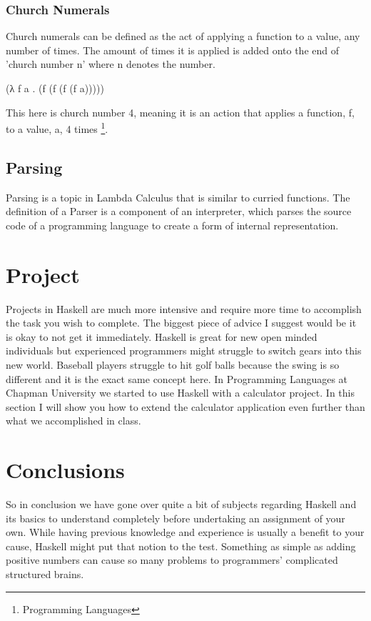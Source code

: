 \documentclass{article}
\begin{document}
        \subsubsection{Church Numerals}
        Church numerals can be defined as the act of applying a function to a value, any number of times. The amount of times it is applied is added onto the end of 'church number n' where n denotes the number.
        
        \medskip
             (\lambda λ f a . (f (f (f (f a)))))
        \medskip
    
    This here is church number 4, meaning it is an action that applies a function, f, to a value, a, 4 times \footnote{Programming Languages}.
        
    \subsection{Parsing}
    Parsing is a topic in Lambda Calculus that is similar to curried functions. The definition of a Parser is a component of an interpreter, which parses the source code of a programming language to create a form of internal representation.
    
    

\section{Project}

Projects in Haskell are much more intensive and require more time to accomplish the task you wish to complete. The biggest piece of advice I suggest would be it is okay to not get it immediately. Haskell is great for new open minded individuals but experienced programmers might struggle to switch gears into this new world. Baseball players struggle to hit golf balls because the swing is so different and it is the exact same concept here. In Programming Languages at Chapman University we started to use Haskell with a calculator project. In this section I will show you how to extend the calculator application even further than what we accomplished in class.

\section{Conclusions}\label{conclusions}

So in conclusion we have gone over quite a bit of subjects regarding Haskell and its basics to understand completely before undertaking an assignment of your own. While having previous knowledge and experience is usually a benefit to your cause, Haskell might put that notion to the test. Something as simple as adding positive numbers can cause so many problems to programmers' complicated structured brains. 
\end{document}
